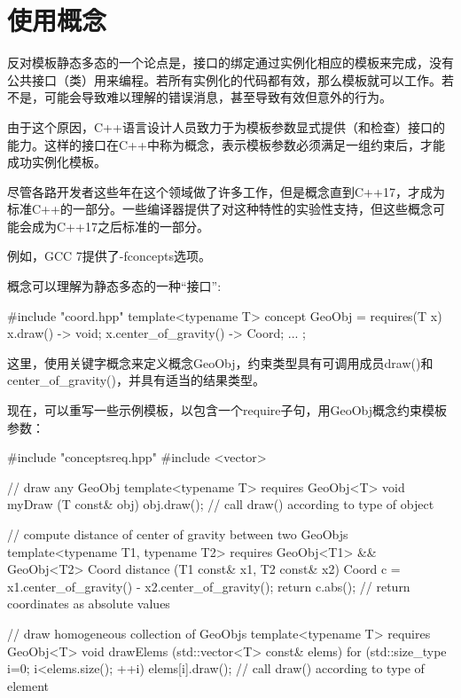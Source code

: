 \section{使用概念}
反对模板静态多态的一个论点是，接口的绑定通过实例化相应的模板来完成，没有公共接口（类）用来编程。若所有实例化的代码都有效，那么模板就可以工作。若不是，可能会导致难以理解的错误消息，甚至导致有效但意外的行为。

由于这个原因，C++语言设计人员致力于为模板参数显式提供（和检查）接口的能力。这样的接口在C++中称为概念，表示模板参数必须满足一组约束后，才能成功实例化模板。

尽管各路开发者这些年在这个领域做了许多工作，但是概念直到C++17，才成为标准C++的一部分。一些编译器提供了对这种特性的实验性支持，但这些概念可能会成为C++17之后标准的一部分。

\begin{notice}
例如，GCC 7提供了-fconcepts选项。
\end{notice}

概念可以理解为静态多态的一种“接口”:

\begin{cpp}
#include "coord.hpp"
template<typename T>
concept GeoObj = requires(T x) {
	{ x.draw() } -> void;
	{ x.center_of_gravity() } -> Coord;
	...
};
\end{cpp}

这里，使用关键字概念来定义概念GeoObj，约束类型具有可调用成员draw()和center\_of\_gravity()，并具有适当的结果类型。

现在，可以重写一些示例模板，以包含一个require子句，用GeoObj概念约束模板参数：

\begin{cpp}
#include "conceptsreq.hpp"
#include <vector>

// draw any GeoObj
template<typename T>
requires GeoObj<T>
void myDraw (T const& obj)
{
	obj.draw(); // call draw() according to type of object
}

// compute distance of center of gravity between two GeoObjs
template<typename T1, typename T2>
requires GeoObj<T1> && GeoObj<T2>
Coord distance (T1 const& x1, T2 const& x2)
{
	Coord c = x1.center_of_gravity() - x2.center_of_gravity();
	return c.abs(); // return coordinates as absolute values
}

// draw homogeneous collection of GeoObjs
template<typename T>
requires GeoObj<T>
void drawElems (std::vector<T> const& elems)
{
	for (std::size_type i=0; i<elems.size(); ++i) {
		elems[i].draw(); // call draw() according to type of element
	}
}
\end{cpp}

